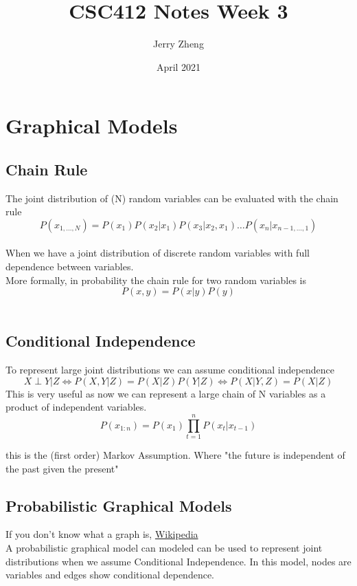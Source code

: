 \documentclass{article}
\title{CSC412 Notes Week 3}
\author{Jerry Zheng}
\date{April 2021}
\begin{document}
\maketitle

\section{Graphical Models}
\subsection{Chain Rule}
The joint distribution of (N) random variables can be evaluated with the chain rule\\

$$P(x_{1, ..., N}) = P(x_1)P(x_2|x_1)P(x_3 | x_2, x_1) \ldots P(x_n | x_{n-1 ,..., 1})$$\\

When we have a joint distribution of discrete random variables with full dependence between variables.\\

More formally, in probability the chain rule for two random variables is\\
$$P(x, y) = P(x | y)P(y)$$\\

\subsection{Conditional Independence}

To represent large joint distributions we can assume conditional independence
$$X \perp Y | Z \Leftrightarrow P(X, Y | Z) = P(X | Z)P(Y | Z) \Leftrightarrow P(X | Y, Z) = P(X | Z)$$
This is very useful as now we can represent a large chain of N variables as a product of independent variables.
$$P(x_{1:n})  = P(x_1) \prod_{t=1}^n P(x_t|x_{t-1})$$

this is the (first order) Markov Assumption. Where "the future is independent of the past given the present"

\subsection{Probabilistic Graphical Models}
If you don't know what a  graph is, \href{https://en.wikipedia.org/wiki/Graph_(discrete_mathematics)}{Wikipedia}\\

A probabilistic graphical model can modeled can be used to represent joint distributions when we assume Conditional Independence. In this model, nodes are variables and edges show conditional dependence.\\
\end{document}
